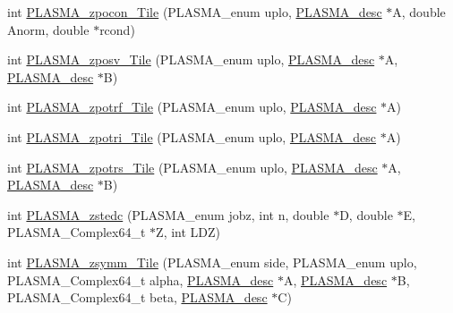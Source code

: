 \begin{DoxyCompactItemize}
\item 
int \hyperlink{group__PLASMA__Complex64__t__Tile_ga29d5240c2f89adeacf17f9109c014511_ga29d5240c2f89adeacf17f9109c014511}{P\+L\+A\+S\+M\+A\+\_\+zpocon\+\_\+\+Tile} (P\+L\+A\+S\+M\+A\+\_\+enum uplo, \hyperlink{structplasma__desc__t}{P\+L\+A\+S\+M\+A\+\_\+desc} $\ast$A, double Anorm, double $\ast$rcond)
\item 
int \hyperlink{group__PLASMA__Complex64__t__Tile_gaf7050f109b30dcdea1cedd1a6577d2b9_gaf7050f109b30dcdea1cedd1a6577d2b9}{P\+L\+A\+S\+M\+A\+\_\+zposv\+\_\+\+Tile} (P\+L\+A\+S\+M\+A\+\_\+enum uplo, \hyperlink{structplasma__desc__t}{P\+L\+A\+S\+M\+A\+\_\+desc} $\ast$A, \hyperlink{structplasma__desc__t}{P\+L\+A\+S\+M\+A\+\_\+desc} $\ast$B)
\item 
int \hyperlink{group__PLASMA__Complex64__t__Tile_gaf062088380cfda1a7dc01bf9596c91e3_gaf062088380cfda1a7dc01bf9596c91e3}{P\+L\+A\+S\+M\+A\+\_\+zpotrf\+\_\+\+Tile} (P\+L\+A\+S\+M\+A\+\_\+enum uplo, \hyperlink{structplasma__desc__t}{P\+L\+A\+S\+M\+A\+\_\+desc} $\ast$A)
\item 
int \hyperlink{group__PLASMA__Complex64__t__Tile_ga30d9bbba83e9e9098c6444553d20f47a_ga30d9bbba83e9e9098c6444553d20f47a}{P\+L\+A\+S\+M\+A\+\_\+zpotri\+\_\+\+Tile} (P\+L\+A\+S\+M\+A\+\_\+enum uplo, \hyperlink{structplasma__desc__t}{P\+L\+A\+S\+M\+A\+\_\+desc} $\ast$A)
\item 
int \hyperlink{group__PLASMA__Complex64__t__Tile_gad13147593a1970092f560e8cb54925b8_gad13147593a1970092f560e8cb54925b8}{P\+L\+A\+S\+M\+A\+\_\+zpotrs\+\_\+\+Tile} (P\+L\+A\+S\+M\+A\+\_\+enum uplo, \hyperlink{structplasma__desc__t}{P\+L\+A\+S\+M\+A\+\_\+desc} $\ast$A, \hyperlink{structplasma__desc__t}{P\+L\+A\+S\+M\+A\+\_\+desc} $\ast$B)
\item 
int \hyperlink{group__PLASMA__Complex64__t__Tile_ga08dcf3c96eab9f429af2d764147e59a0_ga08dcf3c96eab9f429af2d764147e59a0}{P\+L\+A\+S\+M\+A\+\_\+zstedc} (P\+L\+A\+S\+M\+A\+\_\+enum jobz, int n, double $\ast$D, double $\ast$E, P\+L\+A\+S\+M\+A\+\_\+\+Complex64\+\_\+t $\ast$Z, int L\+D\+Z)
\item 
int \hyperlink{group__PLASMA__Complex64__t__Tile_ga87921acde0e9798ffdb9f011b083385b_ga87921acde0e9798ffdb9f011b083385b}{P\+L\+A\+S\+M\+A\+\_\+zsymm\+\_\+\+Tile} (P\+L\+A\+S\+M\+A\+\_\+enum side, P\+L\+A\+S\+M\+A\+\_\+enum uplo, P\+L\+A\+S\+M\+A\+\_\+\+Complex64\+\_\+t alpha, \hyperlink{structplasma__desc__t}{P\+L\+A\+S\+M\+A\+\_\+desc} $\ast$A, \hyperlink{structplasma__desc__t}{P\+L\+A\+S\+M\+A\+\_\+desc} $\ast$B, P\+L\+A\+S\+M\+A\+\_\+\+Complex64\+\_\+t beta, \hyperlink{structplasma__desc__t}{P\+L\+A\+S\+M\+A\+\_\+desc} $\ast$C)

\end{DoxyCompactItemize}
